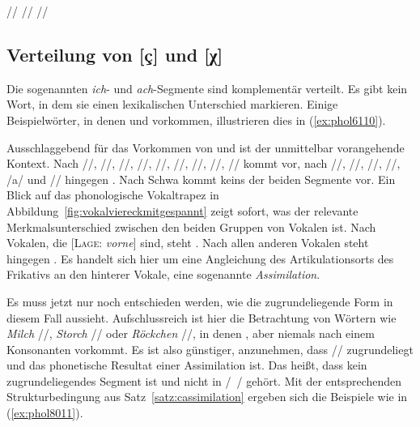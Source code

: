 \begin{exe}
  \ex\label{ex:phol013} \begin{xlist}
  	\ex // \phopro \textipa{[ve:k]}
  	\ex // \phopro \textipa{[h\o:l@]} 
  	\ex // \phopro \textipa{[Po:f@n]}
  \end{xlist}
\end{exe}

\subsection{Verteilung von [ç] und [χ]}

\label{sec:verteilungvonichach}

Die sogenannten \textit{ich}- und \textit{ach}-Segmente sind komplementär verteilt.
Es gibt kein Wort, in dem sie einen lexikalischen Unterschied markieren.
Einige Beispielwörter, in denen \textipa{[\c{c}]} und \textipa{[X]} vorkommen, illustrieren dies in (\ref{ex:phol6110}).

\begin{exe}
  \ex\label{ex:phol6110}
  \begin{xlist}
  \end{xlist}
\end{exe}

Ausschlaggebend für das Vorkommen von \textipa{[\c{c}]} und \textipa{[X]} ist der unmittelbar vorangehende Kontext.
Nach //, //, //, //, //, //, //, /\textipa{\o}/, /\textipa{\oe}/ kommt \textipa{[\c{c}]} vor, nach //, //, //, //, /a/ und // hingegen \textipa{[X]}.
Nach Schwa kommt keins der beiden Segmente vor.
Ein Blick auf das phonologische Vokaltrapez in Abbildung~\ref{fig:vokalviereckmitgespannt} zeigt sofort, was der relevante Merkmalsunterschied zwischen den beiden Gruppen von Vokalen ist.
Nach Vokalen, die [\textsc{Lage}: \textit{vorne}] sind, steht \textipa{[\c{c}]}.
Nach allen anderen Vokalen steht hingegen \textipa{[X]}.
Es handelt sich hier um eine Angleichung des Artikulationsorts des Frikativs an den hinterer Vokale, eine sogenannte \textit{Assimilation}.

Es muss jetzt nur noch entschieden werden, wie die zugrundeliegende Form in diesem Fall aussieht.
Aufschlussreich ist hier die Betrachtung von Wörtern wie \textit{Milch} //, \textit{Storch} // oder \textit{Röckchen} //, in denen \textipa{[\c{c}]}, aber niemals \textipa{[X]} nach einem Konsonanten vorkommt.
Es ist also günstiger, anzunehmen, dass // zugrundeliegt und \textipa{[X]} das phonetische Resultat einer Assimilation ist.
Das heißt, dass \textipa{[X]} kein zugrundeliegendes Segment ist und nicht in /~/ gehört.
Mit der entsprechenden Strukturbedingung aus Satz~\ref{satz:cassimilation} ergeben sich die Beispiele wie in (\ref{ex:phol8011}).


